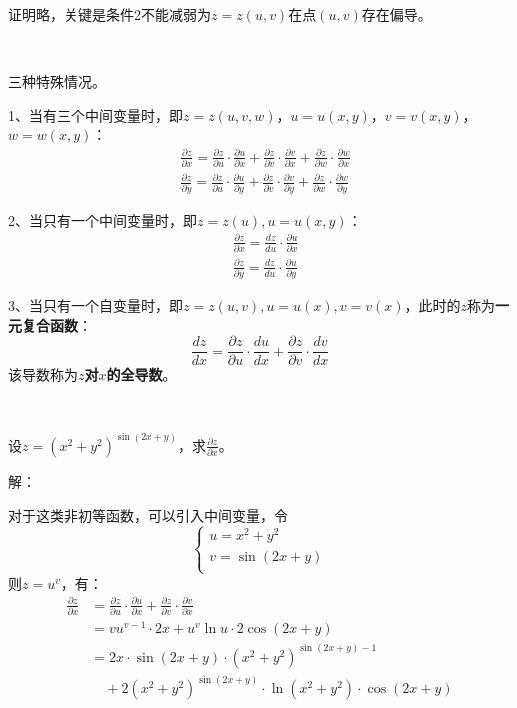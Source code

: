证明略，关键是条件2不能减弱为$z=z\left( u,v \right) $在点$\left( u,v \right) $存在偏导。

~

三种特殊情况。

1、当有三个中间变量时，即$z=z\left( u,v,w \right) $，$u=u\left( x,y \right) $，$v=v\left( x,y \right) $，$w=w\left( x,y \right) $：
\begin{align*}
&\frac{\partial z}{\partial x}=\frac{\partial z}{\partial u}\cdot \frac{\partial u}{\partial x}+\frac{\partial z}{\partial v}\cdot \frac{\partial v}{\partial x}+\frac{\partial z}{\partial w}\cdot \frac{\partial w}{\partial x} \\
&\frac{\partial z}{\partial y}=\frac{\partial z}{\partial u}\cdot \frac{\partial u}{\partial y}+\frac{\partial z}{\partial v}\cdot \frac{\partial v}{\partial y}+\frac{\partial z}{\partial w}\cdot \frac{\partial w}{\partial y}
\end{align*}

2、当只有一个中间变量时，即$z=z\left( u \right) ,u=u\left( x,y \right) $：
\begin{align*}
&\frac{\partial z}{\partial x}=\frac{dz}{du}\cdot \frac{\partial u}{\partial x} \\
&\frac{\partial z}{\partial y}=\frac{dz}{du}\cdot \frac{\partial u}{\partial y}
\end{align*}

3、当只有一个自变量时，即$z=z\left( u,v \right) ,u=u\left( x \right) ,v=v\left( x \right) $，此时的$z$称为{\bf 一元复合函数}：
\[
\frac{dz}{dx}=\frac{\partial z}{\partial u}\cdot \frac{du}{dx}+\frac{\partial z}{\partial v}\cdot \frac{dv}{dx}
\]
该导数称为{\bf $z$对$x$的全导数}。

~

\begin{example}
设$z=\left( x^2+y^2 \right) ^{\sin \left( 2x+y \right)}$，求$\frac{\partial z}{\partial x}$。
\end{example}

解：

对于这类非初等函数，可以引入中间变量，令
\[
\begin{cases}
	u=x^2+y^2\\
	v=\sin \left( 2x+y \right)\\
\end{cases}
\]
则$z=u^v$，有：
\begin{align*}
\frac{\partial z}{\partial x}&=\frac{\partial z}{\partial u}\cdot \frac{\partial u}{\partial x}+\frac{\partial z}{\partial v}\cdot \frac{\partial v}{\partial x} \\
&=vu^{v-1}\cdot 2x+u^v\ln u\cdot 2\cos \left( 2x+y \right) \\
&=2x\cdot \sin \left( 2x+y \right) \cdot \left( x^2+y^2 \right) ^{\sin \left( 2x+y \right) -1} \\
& \quad +2\left( x^2+y^2 \right) ^{\sin \left( 2x+y \right)}\cdot \ln \left( x^2+y^2 \right) \cdot \cos \left( 2x+y \right)
\end{align*}

